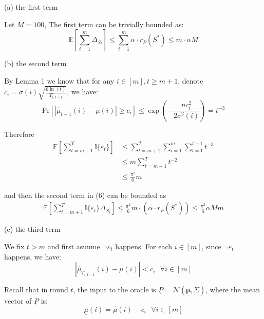 \documentclass[opre,sglanonrev]{informs4}
\begin{document}
(a) the first term 

Let $M  = 100$, The first term can be trivially bounded as:
\begin{equation}
	\mathbb{E}[\sum_{t=1}^{m}\Delta_{S_t}] \leq \sum_{t=1}^{m}\alpha \cdot r_P(S^*) \leq m \cdot \alpha M
\end{equation}

(b) the second term 

By Lemma 1 we know that for any $i \in [m],t\geq m+1$, denote $c_i = \sigma(i)\sqrt{\frac{6\ln(t)}{T_{i,t-1}}}$, we have:
$$
	\text{Pr}[|\hat{\mu}_{t-1}(i)-\mu(i)|\geq c_i] \leq \exp(-\frac{nc_i^2}{2\sigma^2(i)}) = t^{-3}
$$

Therefore
\begin{equation}
	\begin{aligned}
		\mathbb{E}[\sum_{t=m+1}^{T}\mathbb{I}\{\varepsilon_t\}]
		&\leq \sum_{t=m+1}^{T} \sum_{i=1}^{m} \sum_{l=1}^{t-1}t^{-3} \\
		&\leq m \sum_{t=m+1}^{T}t^{-2} \\
		&\leq \frac{\pi^2}{6}m
	\end{aligned}
\end{equation}

and then the second term in (6) can be bounded as
\begin{equation}
	\begin{aligned}
		\mathbb{E}[\sum_{t=m+1}^{T}\mathbb{I}\{\varepsilon_t\}\Delta_{S_t}]\leq \frac{\pi^2}{6}m \cdot (\alpha \cdot r_P(S^*)) \leq \frac{\pi^2}{6}\alpha M m
	\end{aligned}
\end{equation}

(c) the third term 

We fix $t>m$ and first asuume $\lnot \varepsilon_t$ happens. For each $i \in [m]$, since $\lnot \varepsilon_t$ happens, we have:
\begin{equation}
	|\hat{\mu}_{T_{i,t-1}}(i)-\mu(i)| < c_i ~~~ \forall i \in [m]
\end{equation}

Recall that in round $t$, the input to the oracle is $\underline{P} = \mathcal{N}(\underline{\boldsymbol{\mu}},\Sigma)$, where the mean vector of $\underline{P}$ is:
\begin{equation}
	\underline{\mu}(i) = \hat{\mu}(i)-c_i ~~~ \forall i \in [m]
\end{equation}
\end{document}
